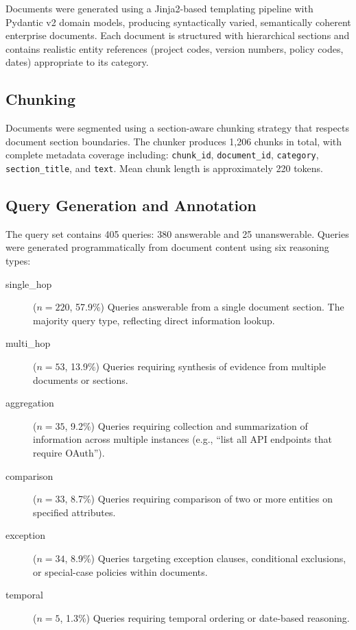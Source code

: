 Documents were generated using a Jinja2-based templating pipeline with Pydantic v2 domain models, producing syntactically varied, semantically coherent enterprise documents. Each document is structured with hierarchical sections and contains realistic entity references (project codes, version numbers, policy codes, dates) appropriate to its category.

\subsection{Chunking}

Documents were segmented using a section-aware chunking strategy that respects document section boundaries. The chunker produces 1,206 chunks in total, with complete metadata coverage including: \texttt{chunk\_id}, \texttt{document\_id}, \texttt{category}, \texttt{section\_title}, and \texttt{text}. Mean chunk length is approximately 220 tokens.

\subsection{Query Generation and Annotation}

The query set contains 405 queries: 380 answerable and 25 unanswerable. Queries were generated programmatically from document content using six reasoning types:

\begin{description}
    \item[single\_hop] ($n{=}220$, 57.9\%) Queries answerable from a single document section. The majority query type, reflecting direct information lookup.
    \item[multi\_hop] ($n{=}53$, 13.9\%) Queries requiring synthesis of evidence from multiple documents or sections.
    \item[aggregation] ($n{=}35$, 9.2\%) Queries requiring collection and summarization of information across multiple instances (e.g., ``list all API endpoints that require OAuth'').
    \item[comparison] ($n{=}33$, 8.7\%) Queries requiring comparison of two or more entities on specified attributes.
    \item[exception] ($n{=}34$, 8.9\%) Queries targeting exception clauses, conditional exclusions, or special-case policies within documents.
    \item[temporal] ($n{=}5$, 1.3\%) Queries requiring temporal ordering or date-based reasoning.
\end{description}

